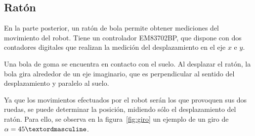 \documentclass[10pt,a4paper,hidelinks]{article}
\begin{document}
\begin{multicols}{2}
\subsection{Ratón}

En la parte posterior, un ratón de bola permite obtener mediciones del movimiento del
robot. Tiene un controlador EM83702BP, que dispone con dos contadores digitales que
realizan la medición del desplazamiento en el eje $x$ e $y$.

Una bola de goma se encuentra en contacto con el suelo. Al desplazar el ratón, 
la bola gira alrededor de un eje imaginario, que es perpendicular al sentido del
desplazamiento y paralelo al suelo.

Ya que los movimientos efectuados por el robot serán los que provoquen sus dos ruedas,
se puede determinar la posición, midiendo sólo el desplazamiento del ratón. Para ello,
se observa en la figura~\ref{fig:giro} un ejemplo de un giro de $\alpha = \RobotAngleº$.

\begin{center}
\end{center}
\end{multicols}
\end{document}
